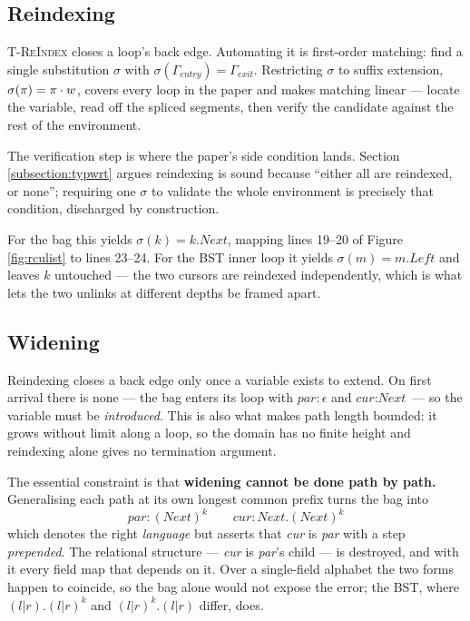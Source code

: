 \subsection{Reindexing}
\label{sec:pathfrag-reindex}

\textsc{T-ReIndex} closes a loop's back edge.  Automating it is first-order
matching: find a single substitution $\sigma$ with $\sigma(\Gamma_{\mathit{entry}})
= \Gamma_{\mathit{exit}}$.  Restricting $\sigma$ to suffix extension,
$\sigma(\pi) = \pi \cdot w$, covers every loop in the paper and makes
matching linear --- locate the variable, read off the spliced segments, then
verify the candidate against the rest of the environment.

The verification step is where the paper's side condition lands.  Section
\ref{subsection:typwrt} argues reindexing is sound because ``either all are
reindexed, or none''; requiring one $\sigma$ to validate the whole environment
is precisely that condition, discharged by construction.

For the bag this yields $\sigma(k) = k.\textit{Next}$, mapping lines 19--20 of
Figure \ref{fig:rculist} to lines 23--24.  For the BST inner loop it yields
$\sigma(m) = m.\textit{Left}$ and leaves $k$ untouched --- the two cursors are
reindexed independently, which is what lets the two unlinks at different depths
be framed apart.

\subsection{Widening}
\label{sec:pathfrag-widen}

Reindexing closes a back edge only once a variable exists to extend.  On first
arrival there is none --- the bag enters its loop with
$\textit{par} : \epsilon$ and $\textit{cur} : \textit{Next}$ --- so the variable
must be \emph{introduced}.  This is also what makes path length bounded: it
grows without limit along a loop, so the domain has no finite height and
reindexing alone gives no termination argument.

The essential constraint is that \textbf{widening cannot be done path by path.}
Generalising each path at its own longest common prefix turns the bag into
\[
\textit{par} : (\textit{Next})^{k}
\qquad
\textit{cur} : \textit{Next}.(\textit{Next})^{k}
\]
which denotes the right \emph{language} but asserts that \textit{cur} is
\textit{par} with a step \emph{prepended}.  The relational structure ---
\textit{cur} is \textit{par}'s child --- is destroyed, and with it every field
map that depends on it.  Over a single-field alphabet the two forms happen to
coincide, so the bag alone would not expose the error; the BST, where
$(l|r).(l|r)^{k}$ and $(l|r)^{k}.(l|r)$ differ, does.

